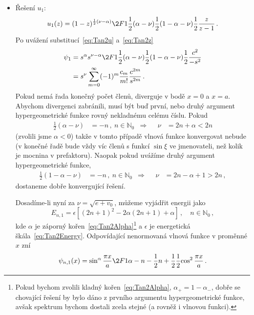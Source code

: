 \begin{solution}
	\begin{itemize}
	\item Řešení $u_{1}$:
		\begin{equation}
			u_{1}(z)
				=(1-z)^{\frac{1}{2}(\nu-\alpha)}
					\2F1{\frac{1}{2}(\alpha-\nu)}{\frac{1}{2}(1-\alpha-\nu)}{\frac{1}{2}}
						{\frac{z}{z-1}}\,.
		\end{equation}
		Po uvážení substitucí~\eqref{eq:Tan2u} a~\eqref{eq:Tan2z} 
		\begin{align}
			\psi_{1}
				&=s^{\alpha}s^{\nu-\alpha}
					\2F1{\frac{1}{2}(\alpha-\nu)}{\frac{1}{2}(1-\alpha-\nu)}
						{\frac{1}{2}}{\frac{c^{2}}{-s^{2}}}\nonumber\\
				&=s^{\nu}\sum_{m=0}^{\infty}(-1)^{m}\frac{c_{m}}{m!}\frac{c^{2m}}{s^{2m}}\,.
		\end{align}
		Pokud nemá řada konečný počet členů, diverguje v bodě $x=0$ a $x=a$.
		Abychom divergenci zabránili, musí být buď první, nebo druhý argument hypergeometrické
		funkce rovný nekladnému celému číslu.
		Pokud
		\begin{align}
			\frac{1}{2}(\alpha-\nu)&=-n\,,\ n\in\mathbb{N}_{0}
				&\Longrightarrow&&\nu&=2n+\alpha<2n
		\end{align}
		(zvolili jsme $\alpha<0$)	takže v tomto případě vlnová funkce konvergovat nebude
		(v konečné řadě bude vždy víc členů s funkcí $\sin\xi$ ve jmenovateli, 
		než kolik je mocnina v prefaktoru).
		Naopak pokud uvážíme druhý argument hypergeometrické funkce,
		\begin{align}
			\frac{1}{2}(1-\alpha-\nu)&=-n\,,\ n\in\mathbb{N}_{0}
				&\Longrightarrow&&\nu&=2n-\alpha+1>2n\,,
		\end{align}
		dostaneme dobře konvergující řešení.
		
		Dosadíme-li nyní za $\nu=\sqrt{e+v_{0}}$, můžeme vyjádřit energii jako
		\begin{equation}
			\label{eq:Tan2Odd}
			E_{n,1}
				=\epsilon\left[(2n+1)^{2}-2\alpha(2n+1)+\alpha\right]\,,\quad n\in\mathbb{N}_{0}\,,
		\end{equation}
		kde $\alpha$ je záporný kořen~\eqref{eq:Tan2Alpha}\footnote{
			Pokud bychom zvolili kladný kořen~\eqref{eq:Tan2Alpha}, $\alpha_{+}=1-\alpha_{-}$,
			dobře se chovající řešení by bylo dáno z prvního argumentu hypergeometrické funkce,
			avšak spektrum bychom dostali zcela stejné (a rovněž i vlnovou funkci).
		}
		a $\epsilon$ je energetická škála~\eqref{eq:Tan2Energy}.
		Odpovídající nenormovaná vlnová funkce v proměnné $x$ zní
		\begin{equation}
			\psi_{n,1}(x)=\sin^{\alpha}\frac{\pi x}{a}
				\2F1{\alpha-n-\frac{1}{2}}{n+\frac{1}{2}}{\frac{1}{2}}
				{\cos^{2}\frac{\pi x}{a}}\,.
		\end{equation}
	

\end{itemize}
\end{solution}
